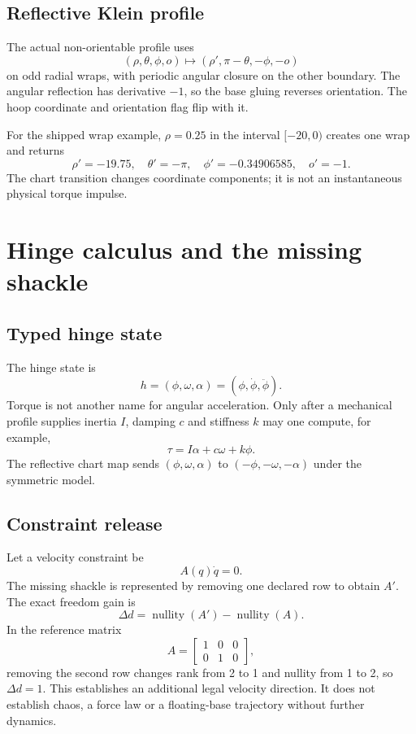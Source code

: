 \documentclass[10pt,a4paper]{article}
\begin{document}
\subsection{Reflective Klein profile}
The actual non-orientable profile uses
\[
(\rho,\theta,\phi,o)\mapsto(\rho',\pi-\theta,-\phi,-o)
\]
on odd radial wraps, with periodic angular closure on the other boundary. The angular reflection has derivative $-1$, so the base gluing reverses orientation. The hoop coordinate and orientation flag flip with it.

For the shipped wrap example, $\rho=0.25$ in the interval $[-20,0)$ creates one wrap and returns
\[
\rho'=-19.75,\quad \theta'=-\pi,\quad \phi'=-0.34906585,\quad o'=-1.
\]
The chart transition changes coordinate components; it is not an instantaneous physical torque impulse.

\section{Hinge calculus and the missing shackle}

\subsection{Typed hinge state}
The hinge state is
\[
h=(\phi,\omega,\alpha)=(\phi,\dot\phi,\ddot\phi).
\]
Torque is not another name for angular acceleration. Only after a mechanical profile supplies inertia $I$, damping $c$ and stiffness $k$ may one compute, for example,
\[
\tau=I\alpha+c\omega+k\phi.
\]
The reflective chart map sends $(\phi,\omega,\alpha)$ to $(-\phi,-\omega,-\alpha)$ under the symmetric model.

\subsection{Constraint release}
Let a velocity constraint be
\[
A(q)\dot q=0.
\]
The missing shackle is represented by removing one declared row to obtain $A'$. The exact freedom gain is
\[
\Delta d=\operatorname{nullity}(A')-\operatorname{nullity}(A).
\]
In the reference matrix
\[
A=\begin{bmatrix}1&0&0\\0&1&0\end{bmatrix},
\]
removing the second row changes rank from 2 to 1 and nullity from 1 to 2, so $\Delta d=1$. This establishes an additional legal velocity direction. It does not establish chaos, a force law or a floating-base trajectory without further dynamics.
\end{document}
